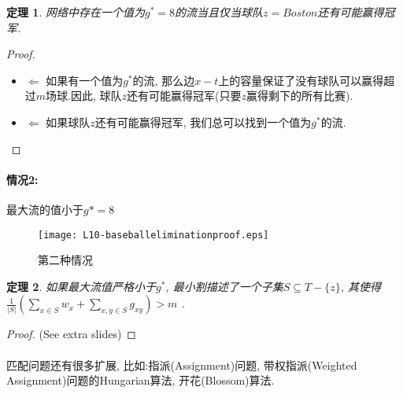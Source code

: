 \documentclass[a4paper]{article}
\newtheorem*{theorem}{定理}
\begin{document}
        \begin{theorem}
网络中存在一个值为$g^*=8$的流当且仅当球队$z=Boston$还有可能赢得冠军.
        \end{theorem}
        \begin{proof}
\begin{itemize} 
 \item $\Leftarrow$
如果有一个值为$g^*$的流, 那么边$x-t$上的容量保证了没有球队可以赢得超过$m$场球.因此, 球队$z$还有可能赢得冠军(只要$z$赢得剩下的所有比赛).
  \item $\Leftarrow$
如果球队$z$还有可能赢得冠军, 我们总可以找到一个值为$g^*$的流.
\end{itemize}
\end{proof}
        \paragraph{情况2:}最大流的值小于$g*=8$
        \begin{figure}[h]
            \centering
            \texttt{[image: L10-baseballeliminationproof.eps]}
            \caption{第二种情况}
            \label{Figure: matching_baseball_elimination_proof}
        \end{figure}
        \begin{theorem}
如果最大流值严格小于$g^*$, 最小割描述了一个子集$S \subseteq T-\{z\}$, 其使得$\frac{1}{|S|} ( \sum\nolimits_{x\in S} w_x + \sum\nolimits_{x,y\in S} g_{xy} ) > m$ \nonumber.
        \end{theorem}
        \begin{proof}
 (See extra slides)
        \end{proof}
        \paragraph{} 匹配问题还有很多扩展, 比如:指派({\sc Assignment})问题, 带权指派({\sc Weighted Assignment})问题的Hungarian算法, 开花(Blossom)算法.
        
 
 
 
\end{document}

